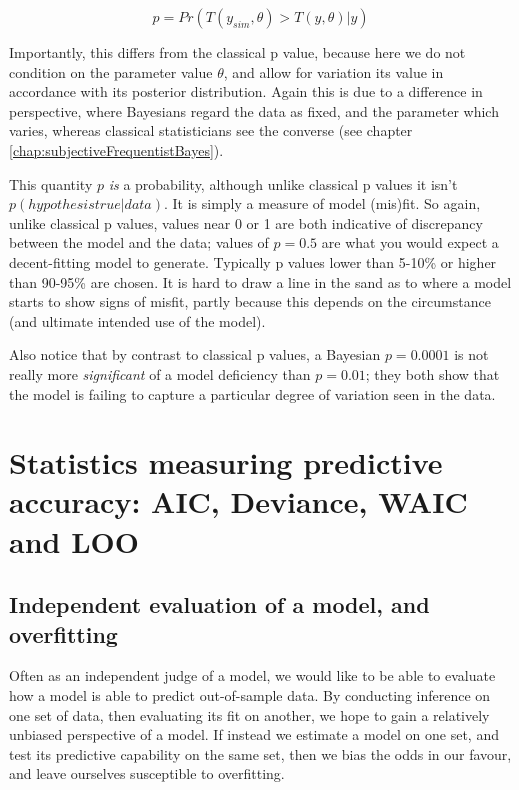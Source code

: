 \documentclass[11pt,fullpage]{book}
\begin{document}
\begin{equation}
p = Pr(T(y_{sim},\theta)>T(y,\theta)|y)
\end{equation}

Importantly, this differs from the classical p value, because here we do not condition on the parameter value $\theta$, and allow for variation its value in accordance with its posterior distribution. Again this is due to a difference in perspective, where Bayesians regard the data as fixed, and the parameter which varies, whereas classical statisticians see the converse (see chapter \ref{chap:subjectiveFrequentistBayes}).

This quantity $p$ \textit{is} a probability, although unlike classical p values it isn't $p(hypothesis true|data)$. It is simply a measure of model (mis)fit. So again, unlike classical p values, values near 0 or 1 are both indicative of discrepancy between the model and the data; values of $p=0.5$ are what you would expect a decent-fitting model to generate. Typically p values lower than 5-10\% or higher than 90-95\% are chosen. It is hard to draw a line in the sand as to where a model starts to show signs of misfit, partly because this depends on the circumstance (and ultimate intended use of the model).

Also notice that by contrast to classical p values, a Bayesian $p=0.0001$ is not really more \textit{significant} of a model deficiency than $p=0.01$; they both show that the model is failing to capture a particular degree of variation seen in the data.

\section{Statistics measuring predictive accuracy: AIC, Deviance, WAIC and LOO}
\subsection{Independent evaluation of a model, and overfitting}

Often as an independent judge of a model, we would like to be able to evaluate how a model is able to predict out-of-sample data. By conducting inference on one set of data, then evaluating its fit on another, we hope to gain a relatively unbiased perspective of a model. If instead we estimate a model on one set, and test its predictive capability on the same set, then we bias the odds in our favour, and leave ourselves susceptible to overfitting. 
\end{document}
